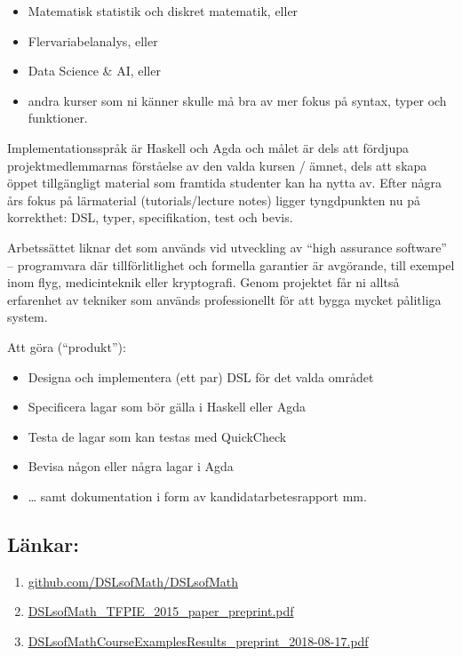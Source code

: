 \documentclass{article}
\providecommand{\tightlist}{%
  \setlength{\itemsep}{0pt}\setlength{\parskip}{0pt}}
\begin{document}
\begin{itemize}
\tightlist
\item
  Matematisk statistik och diskret matematik, eller
\item
  Flervariabelanalys, eller
\item
  Data Science \& AI, eller
\item
  andra kurser som ni känner skulle må bra av mer fokus på syntax, typer
  och funktioner.
\end{itemize}

Implementationsspråk är Haskell och Agda och målet är dels att fördjupa projektmedlemmarnas förståelse av den valda kursen / ämnet, dels att skapa öppet tillgängligt material som framtida studenter kan ha nytta av. Efter några års fokus på lärmaterial (tutorials/lecture notes) ligger tyngdpunkten nu på korrekthet: DSL, typer, specifikation, test och bevis.

Arbetssättet liknar det som används vid utveckling av ``high assurance software'' – programvara där tillförlitlighet och formella garantier är avgörande, till exempel inom flyg, medicinteknik eller kryptografi. Genom projektet får ni alltså erfarenhet av tekniker som används professionellt för att bygga mycket pålitliga system.

Att göra (``produkt''):

\begin{itemize}
\tightlist
\item
  Designa och implementera (ett par) DSL för det valda området
\item
  Specificera lagar som bör gälla i Haskell eller Agda
\item
  Testa de lagar som kan testas med QuickCheck
\item
  Bevisa någon eller några lagar i Agda
\item
  \ldots{} samt dokumentation i form av kandidatarbetesrapport mm.
\end{itemize}

\subsection{Länkar:}\label{luxe4nkar}

\begin{enumerate}
\def\labelenumi{\arabic{enumi}.}
\tightlist
\item \href{https://github.com/DSLsofMath/DSLsofMath}{github.com/DSLsofMath/DSLsofMath}
\item \href{https://www.cse.chalmers.se/~patrikj/papers/Ionescu_Jansson_DSLsofMath_TFPIE_2015_paper_preprint.pdf}{DSLsofMath\_TFPIE\_2015\_paper\_preprint.pdf}
\item \href{https://www.cse.chalmers.se/~patrikj/papers/Janssonetal_DSLsofMathCourseExamplesResults_preprint_2018-08-17.pdf}{DSLsofMathCourseExamplesResults\_preprint\_2018-08-17.pdf}
\end{enumerate}
\end{document}
